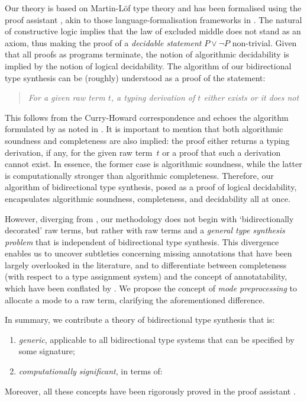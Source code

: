Our theory is based on Martin-L\"of type theory and has been formalised using the proof assistant \Agda, akin to those language-formalisation frameworks in .
The natural of constructive logic implies that the law of excluded middle does not stand as an axiom, thus making the proof of a \emph{decidable statement} $P \vee \neg P$ non-trivial.
Given that all proofs as programs terminate, the notion of algorithmic decidability is implied by the notion of logical decidability.
The algorithm of our bidirectional type synthesis can be (roughly) understood as a proof of the statement:
\begin{quote}
  \emph{For a given raw term $t$, a typing derivation of $t$ either exists or it does not}
\end{quote}
This follows from the Curry-Howard correspondence and echoes the algorithm formulated by \citet{Wadler2022} as noted in .
It is important to mention that both algorithmic soundness and completeness are also implied: the proof either returns a typing derivation, if any, for the given raw term~$t$ or a proof that such a derivation cannot exist.
In essence, the former case is algorithmic soundness, while the latter is computationally stronger than algorithmic completeness.
Therefore, our algorithm of bidirectional type synthesis, posed as a proof of logical decidability, encapsulates algorithmic soundness, completeness, and decidability all at once.

However, diverging from \citet{Wadler2022}, our methodology does not begin with `bidirectionally decorated' raw terms, but rather with raw terms and a \emph{general type synthesis problem} that is independent of bidirectional type synthesis.
This divergence enables us to uncover subtleties concerning missing annotations that have been largely overlooked in the literature, and to differentiate between completeness (with respect to a type assignment system) and the concept of annotatability, which have been conflated by \citet{Dunfield2021}.
We propose the concept of \emph{mode preprocessing} to allocate a mode to a raw term, clarifying the aforementioned difference.

In summary, we contribute a theory of bidirectional type synthesis that is:
\begin{enumerate}
  \item \emph{generic}, applicable to all bidirectional type systems that can be specified by some signature;
  \item \emph{computationally significant}, in terms of: 
\end{enumerate}
Moreover, all these concepts have been rigorously proved in the proof assistant \Agda.

